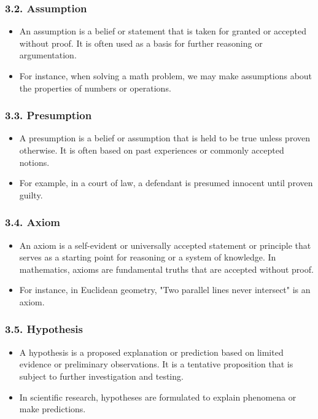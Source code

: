 \documentclass{article}
\begin{document}
\subsubsection*{3.2. Assumption}
\begin{itemize}
\item An assumption is a belief or statement that is taken for granted or accepted without proof. It is often used as a basis for further reasoning or argumentation.
\item For instance, when solving a math problem, we may make assumptions about the properties of numbers or operations.
\end{itemize}
\subsubsection*{3.3. Presumption}
\begin{itemize}
\item A presumption is a belief or assumption that is held to be true unless proven otherwise. It is often based on past experiences or commonly accepted notions.
\item For example, in a court of law, a defendant is presumed innocent until proven guilty.
\end{itemize}
\subsubsection*{3.4. Axiom}
\begin{itemize}
\item An axiom is a self-evident or universally accepted statement or principle that serves as a starting point for reasoning or a system of knowledge. In mathematics, axioms are fundamental truths that are accepted without proof.
\item For instance, in Euclidean geometry, "Two parallel lines never intersect" is an axiom.
\end{itemize}
\subsubsection*{3.5. Hypothesis}
\begin{itemize}
\item A hypothesis is a proposed explanation or prediction based on limited evidence or preliminary observations. It is a tentative proposition that is subject to further investigation and testing.
\item In scientific research, hypotheses are formulated to explain phenomena or make predictions.
\end{itemize}
\end{document}
